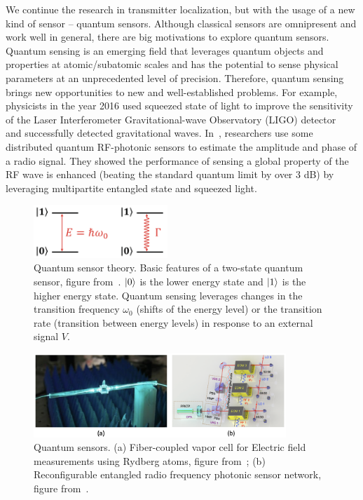 We continue the research in transmitter localization, but with the usage of a new kind of sensor -- quantum sensors.
Although classical sensors are omnipresent and work well in general, there are big motivations to explore quantum sensors.
Quantum sensing is an emerging field that leverages quantum objects and properties at atomic/subatomic scales and has 
the potential to sense physical parameters at an unprecedented level of precision.
Therefore, quantum sensing brings new opportunities to new and well-established problems.
For example, physicists in the year 2016 used squeezed state of light to improve the sensitivity of the Laser Interferometer 
Gravitational-wave Observatory (LIGO) detector~\cite{ligo_2015} and successfully detected gravitational waves.
In~\cite{PRL20-qsn}, researchers use some distributed quantum RF-photonic sensors to estimate the amplitude and phase of a radio signal.
They showed the performance of sensing a global property of the RF wave is enhanced (beating the standard quantum limit by over 3 dB)
by leveraging multipartite entangled state and squeezed light.


\begin{figure}[t]
      \centering
      \includegraphics[width=0.45\textwidth]{figures/qsensor.png}
      \caption{Quantum sensor theory. Basic features of a two-state quantum sensor, figure from~\cite{RevModPhys.quantumsensing}.
               $\ket{0}$ is the lower energy state and $\ket{1}$ is the higher energy state. Quantum sensing leverages changes in the
               transition frequency $\omega_{0}$ (shifts of the energy level) or the transition rate (transition between energy levels) 
               in response to an external signal $V$.} 
      \label{fig:intro-qsensor}
\end{figure}

\begin{figure}[t]
      \centering
      \includegraphics[width=0.85\textwidth]{figures/qsensor2.png}
      \caption{Quantum sensors. (a) Fiber-coupled vapor cell for Electric field measurements using Rydberg atoms, figure from~\cite{rydberg};
               (b) Reconfigurable entangled radio frequency photonic sensor network, figure from~\cite{PRL20-qsn}.} 
      \label{fig:intro-qsensor2}
\end{figure}

